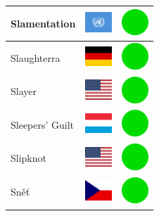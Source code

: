 \documentclass[12pt, a4paper, twoside]{report}
\begin{document}
\begin{center}
\begin{longtable}{|p{5cm}|p{2cm}|p{2cm}|}
 Slamentation                                               & \includegraphics[width=1cm]{../4x3/un} &   \includegraphics[width=1cm]{../likes/y} \\ \hline
 Slaughterra                                                & \includegraphics[width=1cm]{../4x3/de} &   \includegraphics[width=1cm]{../likes/y} \\ \hline
 Slayer                                                     & \includegraphics[width=1cm]{../4x3/us} &   \includegraphics[width=1cm]{../likes/y} \\ \hline
 Sleepers' Guilt                                            & \includegraphics[width=1cm]{../4x3/lu} &   \includegraphics[width=1cm]{../likes/y} \\ \hline
 Slipknot                                                   & \includegraphics[width=1cm]{../4x3/us} &   \includegraphics[width=1cm]{../likes/y} \\ \hline
 Sněť                                                       & \includegraphics[width=1cm]{../4x3/cz} &   \includegraphics[width=1cm]{../likes/y} \\ \hline

\end{longtable}
\end{center}
\end{document}
